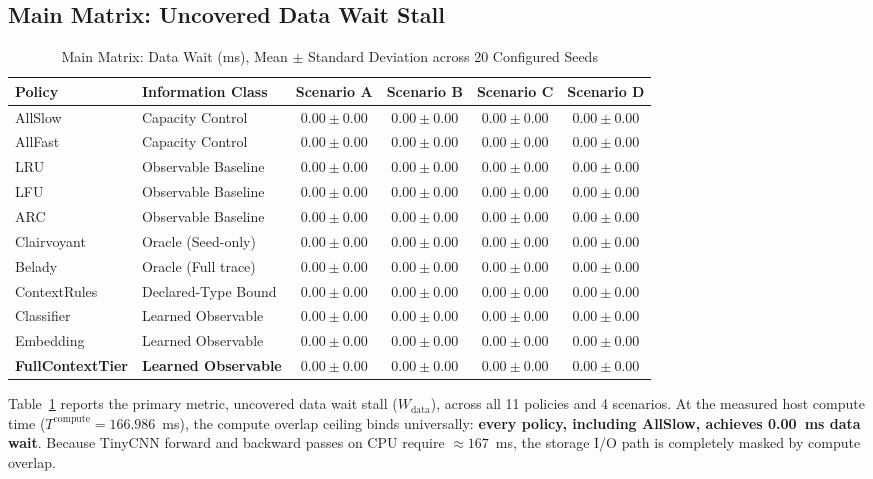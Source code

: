 \documentclass[conference]{IEEEtran}
\begin{document}
\subsection{Main Matrix: Uncovered Data Wait Stall}

\begin{table}[t]
\centering
\caption{Main Matrix: Data Wait (ms), Mean $\pm$ Standard Deviation across 20 Configured Seeds}
\label{tab:main_matrix}
\begin{tabular}{llcccc}
\toprule
\textbf{Policy} & \textbf{Information Class} & \textbf{Scenario A} & \textbf{Scenario B} & \textbf{Scenario C} & \textbf{Scenario D} \\
\midrule
AllSlow & Capacity Control & $0.00 \pm 0.00$ & $0.00 \pm 0.00$ & $0.00 \pm 0.00$ & $0.00 \pm 0.00$ \\
AllFast & Capacity Control & $0.00 \pm 0.00$ & $0.00 \pm 0.00$ & $0.00 \pm 0.00$ & $0.00 \pm 0.00$ \\
\midrule
LRU & Observable Baseline & $0.00 \pm 0.00$ & $0.00 \pm 0.00$ & $0.00 \pm 0.00$ & $0.00 \pm 0.00$ \\
LFU & Observable Baseline & $0.00 \pm 0.00$ & $0.00 \pm 0.00$ & $0.00 \pm 0.00$ & $0.00 \pm 0.00$ \\
ARC & Observable Baseline & $0.00 \pm 0.00$ & $0.00 \pm 0.00$ & $0.00 \pm 0.00$ & $0.00 \pm 0.00$ \\
\midrule
Clairvoyant & Oracle (Seed-only) & $0.00 \pm 0.00$ & $0.00 \pm 0.00$ & $0.00 \pm 0.00$ & $0.00 \pm 0.00$ \\
Belady & Oracle (Full trace) & $0.00 \pm 0.00$ & $0.00 \pm 0.00$ & $0.00 \pm 0.00$ & $0.00 \pm 0.00$ \\
ContextRules & Declared-Type Bound & $0.00 \pm 0.00$ & $0.00 \pm 0.00$ & $0.00 \pm 0.00$ & $0.00 \pm 0.00$ \\
\midrule
Classifier & Learned Observable & $0.00 \pm 0.00$ & $0.00 \pm 0.00$ & $0.00 \pm 0.00$ & $0.00 \pm 0.00$ \\
Embedding & Learned Observable & $0.00 \pm 0.00$ & $0.00 \pm 0.00$ & $0.00 \pm 0.00$ & $0.00 \pm 0.00$ \\
\textbf{FullContextTier} & \textbf{Learned Observable} & $\mathbf{0.00 \pm 0.00}$ & $\mathbf{0.00 \pm 0.00}$ & $\mathbf{0.00 \pm 0.00}$ & $\mathbf{0.00 \pm 0.00}$ \\
\bottomrule
\end{tabular}
\end{table}

Table~\ref{tab:main_matrix} reports the primary metric, uncovered data wait stall ($W_{\text{data}}$), across all 11 policies and 4 scenarios. At the measured host compute time ($T^{\text{compute}} = 166.986$~ms), the compute overlap ceiling binds universally: \textbf{every policy, including AllSlow, achieves 0.00~ms data wait}. Because TinyCNN forward and backward passes on CPU require $\approx 167$~ms, the storage I/O path is completely masked by compute overlap.
\end{document}
